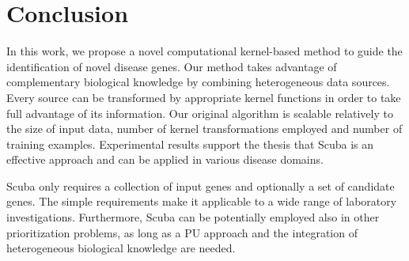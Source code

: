 \section{Conclusion}
In this work, we propose a novel computational kernel-based method to guide the identification of novel disease genes. Our method takes advantage of complementary biological knowledge by combining heterogeneous data sources. Every source can be transformed by appropriate kernel functions in order to take full advantage of its information. Our original algorithm is scalable relatively to the size of input data, number of kernel transformations employed and number of training examples. Experimental results support the thesis that Scuba is an effective approach and can be applied in various disease domains.

Scuba only requires a collection of input genes and optionally a set of candidate genes. The simple requirements make it applicable to a wide range of laboratory investigations. Furthermore, Scuba can be potentially employed also in other prioritization problems, as long as a PU approach and the integration of heterogeneous biological knowledge are needed.